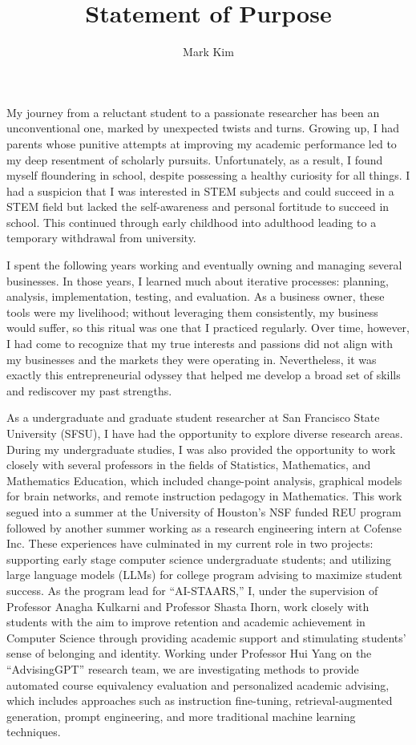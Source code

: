 \documentclass[10pt]{article}
\author{Mark Kim}
\title{Statement of Purpose}
\begin{document}
\maketitle
My journey from a reluctant student to a passionate researcher has been an unconventional one, marked by unexpected twists and
turns. Growing up, I had parents whose punitive attempts at improving my academic performance led to my deep resentment of scholarly
pursuits. Unfortunately, as a result, I found myself floundering in school, despite possessing a healthy curiosity for all things. I had a
suspicion that I was interested in STEM subjects and could succeed in a STEM field but lacked the self-awareness and personal fortitude to
succeed in school. This continued through early childhood into adulthood leading to a temporary withdrawal from university.

I spent the following years working and eventually owning and managing several businesses. In those years, I learned much about iterative
processes: planning, analysis, implementation, testing, and evaluation. As a business owner, these tools were my livelihood; without
leveraging them consistently, my business would suffer, so this ritual was one that I practiced regularly. Over time, however, I had come
to recognize that my true interests and passions did not align with my businesses and the markets they were operating in. Nevertheless, it
was exactly this entrepreneurial odyssey that helped me develop a broad set of skills and rediscover my past strengths.

As a undergraduate and graduate student researcher at San Francisco State University (SFSU), I have had the opportunity to explore diverse
research areas. During my undergraduate studies, I was also provided the opportunity to work closely with several professors in the fields
of Statistics, Mathematics, and Mathematics Education, which included change-point analysis, graphical models for brain networks, and
remote instruction pedagogy in Mathematics. This work segued into a summer at the University of Houston's NSF funded REU program followed
by another summer working as a research engineering intern at Cofense Inc. These experiences have culminated in my current role in two
projects: supporting early stage computer science undergraduate students; and utilizing large language models (LLMs) for college program
advising to maximize student success. As the program lead for ``AI-STAARS,'' I, under the supervision of Professor Anagha Kulkarni and
Professor Shasta Ihorn, work closely with students with the aim to improve retention and academic achievement in Computer Science through
providing academic support and stimulating students' sense of belonging and identity. Working under Professor Hui Yang on the
``AdvisingGPT'' research team, we are investigating methods to provide automated course equivalency evaluation and personalized academic
advising, which includes approaches such as instruction fine-tuning, retrieval-augmented generation, prompt engineering, and more
traditional machine learning techniques.
\end{document}
